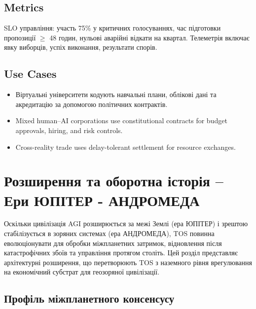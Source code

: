\documentclass[11pt]{article}
\begin{document}
\subsection{Metrics}
SLO управління: участь 75\% у критичних голосуваннях, час підготовки пропозиції $\geq$ 48 годин, нульові аварійні відкати на квартал. Телеметрія включає явку виборців, успіх виконання, результати спорів.

\subsection{Use Cases}
\begin{itemize}[noitemsep]
  \item Віртуальні університети кодують навчальні плани, облікові дані та акредитацію за допомогою політичних контрактів.
  \item Mixed human--AI corporations use constitutional contracts for budget approvals, hiring, and risk controls.
  \item Cross-reality trade uses delay-tolerant settlement for resource exchanges.
\end{itemize}

\section{Розширення та оборотна історія -- Ери ЮПІТЕР - АНДРОМЕДА}
\label{sec:expansion}

Оскільки цивілізація AGI розширюється за межі Землі (ера ЮПІТЕР) і зрештою стабілізується в зоряних системах (ера АНДРОМЕДА), TOS повинна еволюціонувати для обробки міжпланетних затримок, відновлення після катастрофічних збоїв та управління протягом століть. Цей розділ представляє архітектурні розширення, що перетворюють TOS з наземного рівня врегулювання на економічний субстрат для геозоряної цивілізації.

\subsection{Профіль міжпланетного консенсусу}
\end{document}
